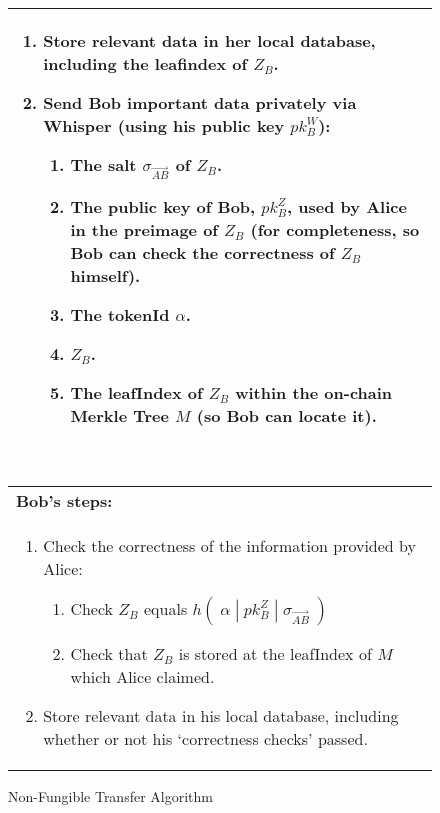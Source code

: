 \begin{figure}[htbp]
\begin{center}
\begin{framed}
\begin{tabular}{p{16cm}}
        \begin{enumerate}
          \setcounter{enumi}{\value{ongoingEnumCounter}}
          \item Store relevant data in her local database, including the leafindex of $Z_B$.
          \item Send Bob important data privately via Whisper (using his public key $pk^W_B$):
          \begin{enumerate}
            \item The salt $\sigma_{\vec{AB}}$ of $Z_B$.
            \item The public key of Bob, $pk^Z_B$, used by Alice in the preimage of $Z_B$ (for completeness, so Bob can check the correctness of $Z_B$ himself).
            \item The tokenId $\alpha$.
            \item $Z_B$.
            \item The leafIndex of $Z_B$ within the on-chain Merkle Tree $M$ (so Bob can locate it).
          \end{enumerate}
          \setcounter{ongoingEnumCounter}{\value{enumi}}
        \end{enumerate}
        \ \\
        \midrule
        \textbf{Bob's steps:}\\
        \begin{enumerate}
          \setcounter{enumi}{\value{ongoingEnumCounter}}
          \item Check the correctness of the information provided by Alice:
          \begin{enumerate}
            \item Check $Z_B$ equals $h(\;\alpha\;|\;pk^Z_B\;|\;\sigma_{\vec{AB}}\;)$
            \item Check that $Z_B$ is stored at the leafIndex of $M$ which Alice claimed.
          \end{enumerate}
          \item Store relevant data in his local database, including whether or not his `correctness checks' passed.
          \setcounter{ongoingEnumCounter}{0} %
        \end{enumerate} 
			\end{tabular}
		\end{framed}
	\end{center}
\caption{Non-Fungible Transfer Algorithm} %
\end{figure}


